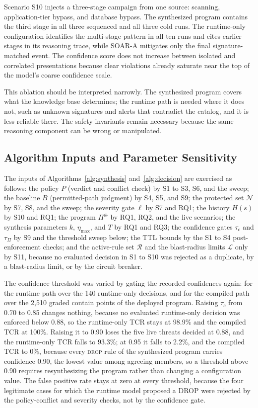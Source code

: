 \documentclass[final,5p]{elsarticle}
\begin{document}
Scenario S10 injects a three-stage campaign from one source: scanning, application-tier bypass, and database bypass. The synthesized program contains the third stage in all three sequenced and all three cold runs. The runtime-only configuration identifies the multi-stage pattern in all ten runs and cites earlier stages in its reasoning trace, while SOAR-A mitigates only the final signature-matched event. The confidence score does not increase between isolated and correlated presentations because clear violations already saturate near the top of the model's coarse confidence scale.

This ablation should be interpreted narrowly. The synthesized program covers what the knowledge base determines; the runtime path is needed where it does not, such as unknown signatures and alerts that contradict the catalog, and it is less reliable there. The safety invariants remain necessary because the same reasoning component can be wrong or manipulated.

\subsection{Algorithm Inputs and Parameter Sensitivity}
\label{sec:sensitivity}

The inputs of Algorithms~\ref{alg:synthesis} and~\ref{alg:decision} are exercised as follows: the policy $P$ (verdict and conflict check) by S1 to S3, S6, and the sweep; the baseline $B$ (permitted-path judgment) by S4, S5, and S9; the protected set $\mathcal{N}$ by S7, S8, and the sweep; the severity gate $\ell$ by S7 and RQ1; the history $H(s)$ by S10 and RQ1; the program $\Pi^{\oplus}$ by RQ1, RQ2, and the live scenarios; the synthesis parameters $k$, $\eta_{\max}$, and $T$ by RQ1 and RQ3; the confidence gates $\tau_c$ and $\tau_\Pi$ by S9 and the threshold sweep below; the TTL bounds by the S1 to S4 post-enforcement checks; and the active-rule set $\mathcal{R}$ and the blast-radius limits $\mathcal{L}$ only by S11, because no evaluated decision in S1 to S10 was rejected as a duplicate, by a blast-radius limit, or by the circuit breaker.

The confidence threshold was varied by gating the recorded confidences again: for the runtime path over the 140 runtime-only decisions, and for the compiled path over the 2,510 graded contain points of the deployed program. Raising $\tau_c$ from 0.70 to 0.85 changes nothing, because no evaluated runtime-only decision was enforced below 0.88, so the runtime-only TCR stays at 98.9\% and the compiled TCR at 100\%. Raising it to 0.90 loses the five live threats decided at 0.88, and the runtime-only TCR falls to 93.3\%; at 0.95 it falls to 2.2\%, and the compiled TCR to 0\%, because every \textsc{drop} rule of the synthesized program carries confidence 0.90, the lowest value among agreeing members, so a threshold above 0.90 requires resynthesizing the program rather than changing a configuration value. The false positive rate stays at zero at every threshold, because the four legitimate cases for which the runtime model proposed a DROP were rejected by the policy-conflict and severity checks, not by the confidence gate.
\end{document}
